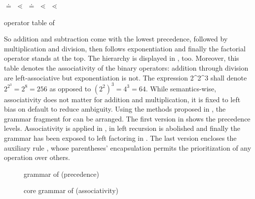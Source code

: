\begin{center}
\opplus{} $\doteq{}$ \opminus{} $\lessdot{}$ \opmult{} $\doteq{}$ \opdiv{} $\lessdot{}$ \oppow{} $\lessdot{}$ \opfact{}
\end{center}

\begin{table}[H]
	\centering
	\caption{operator table of }
	\label{tab:exp_prec}

	
\end{table}

So addition and subtraction come with the lowest precedence, followed by multiplication and division, then follows exponentiation and finally the factorial operator stands at the top. The hierarchy is displayed in , too. Moreover, this table denotes the associativity of the binary operators: addition through division are left-associative but exponentiation is not. The expression 2\^{}2\^{}3 shall denote $2^{2^3}=2^8=256$ as opposed to $(2^2)^3=4^3=64$. While semantics-wise, associativity does not matter for addition and multiplication, it is fixed to left bias on default to reduce ambiguity. Using the methods proposed in , the grammar fragment for  can be arranged. The first version in  shows the precedence levels. Associativity is applied in , in  left recursion is abolished and finally the grammar has been exposed to left factoring in . The last version encloses the auxiliary rule , whose parentheses' encapsulation permits the prioritization of any operation over others.

\FloatBarrier

\begin{figure}[H]
	\centering
	
	

	\caption{grammar of  (precedence)}
	\label{fig:grammar_core_exp_prec}
\end{figure}

\begin{figure}[H]
	\centering
	
	

	\caption{core grammar of  (associativity)}
	\label{fig:grammar_core_exp_assoc}
\end{figure}

